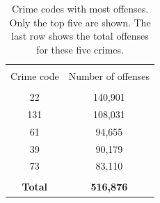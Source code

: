 \documentclass[11pt, english]{article}
\begin{document}
\begin{multicols}{2}
\begin{table}[t]
\end{table}

\begin{table}
	\caption{Crime codes with most offenses. Only the top five are shown. The last row shows the total offenses for these five crimes.}
	\label{tab:notorious-crimes}
	\centering
	\begin{tabular}{cc}
		\hline\hline
		\\[-1.5ex]
		Crime code		&	Number of offenses	\\[0.5ex]\hline
		\\[-1.5ex]
		22				&	140,901	\\[0.2ex]
		131				&	108,031				\\[0.2ex]
		61				&	\hspace{1ex}94,655	\\[0.2ex]
		39				&	\hspace{1ex}90,179	\\[0.2ex]
		73				&	\hspace{1ex}83,110	\\[0.2ex]\hline
		\\[-2ex]
		\textbf{Total}	&	\textbf{516,876}	\\[0.5ex]
		\hline\hline
	\end{tabular}

\end{table}


\end{multicols}
\end{document}
